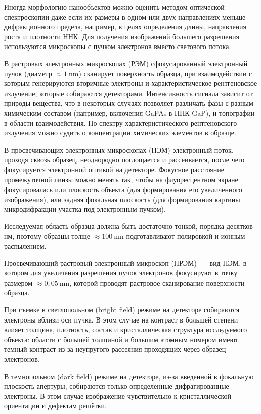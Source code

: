 Иногда морфологию нанообъектов можно оценить методом оптической спектроскопии
даже если их размеры в одном или двух направлениях меньше дифракционного
предела, например, в целях определения длины, направления роста и плотности
ННК. Для получения изображений большего разрешения используются микроскопы с
пучком электронов вместо светового потока.

В растровых электронных микроскопах (РЭМ) сфокусированный электронный пучок
(диаметр \(\approx 1~\si{\nano\meter}\)) сканирует поверхность образца, при
взаимодействии с которым генерируются вторичные электроны и характеристическое
рентгеновское излучение, которые собираются детекторами. Интенсивность сигнала
зависит от природы вещества, что в некоторых случаях позволяет различать фазы с
разным химическим составом (например, включения GaPAs в ННК GaP), и топографии
в области взаимодействия. По спектру характеристического рентгеновского
излучения можно судить о концентрации химических элементов в образце.

В просвечивающих электронных микроскопах (ПЭМ) электронный поток, проходя
сквозь образец, неоднородно поглощается и рассеивается, после чего фокусируется
электронной оптикой на детекторе. Фокусное расстояние промежуточной линзы можно
менять так, чтобы на флуоресцентном экране фокусировалась или плоскость объекта
(для формирования его увеличенного изображения), или задняя фокальная плоскость
(для формирования картины микродифракции участка под электронным пучком).

Исследуемая область образца должна быть достаточно тонкой, порядка десятков нм,
поэтому образцы толще \(\approx 100~\si{\nano\meter}\) подготавливают
полировкой и ионным распылением.

Просвечивающий растровый электронный микроскоп (ПРЭМ)~--- вид ПЭМ, в котором
для увеличения разрешения пучок электронов фокусируют в точку размером
\(\approx 0,05~\si{\nano\meter}\), которой проводят растровое сканирование
поверхности образца.

При съемке в светлопольном (bright field) режиме на детекторе собираются
электроны вблизи оси пучка. В этом случае на контраст в большей степени влияет
толщина, плотность, состав и кристаллическая структура исследуемого объекта:
области с большей толщиной и большим атомным номером имеют темный контраст
из-за неупругого рассеяния проходящих через образец электронов.

В темнопольном (dark field) режиме на детекторе, из-за введенной в фокальную
плоскость апертуры, собираются только определенные дифрагированные электроны. В
этом случае изображение чувствительно к кристаллической ориентации и дефектам
решётки.

